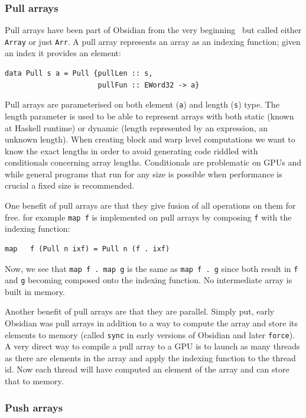 \documentclass[a4paper]{book}
\begin{document}
\subsubsection{Pull arrays}

Pull arrays have been part of Obsidian from the very beginning~\citet{JMT} but called either 
{\tt Array} or just {\tt Arr}. A pull array represents an array as an indexing function; given 
an index it provides an element: 

\begin{verbatim} 
data Pull s a = Pull {pullLen :: s, 
                      pullFun :: EWord32 -> a}
\end{verbatim} 

Pull arrays are parameterised on both element ({\tt a}) and length ({\tt s}) type. The length 
parameter is used to be able to represent arrays with both static (known at Haskell runtime) 
or dynamic (length represented by an expression, an unknown length). When creating block and 
warp level computations we want to know the exact lengths in order to avoid generating code 
riddled with conditionals concerning array lengths. Conditionals are problematic on GPUs and 
while general programs that run for any size is possible when performance is crucial a fixed 
size is recommended. 

One benefit of pull arrays are that they give fusion of all operations on them for free. for example {\tt map f} is implemented on pull arrays by composing {\tt f} with the indexing function: 

\begin{verbatim} 
map   f (Pull n ixf) = Pull n (f . ixf)
\end{verbatim}

Now, we see that {\tt map f . map g} is the same as {\tt map f . g} since both result in {\tt f}
and {\tt g} becoming composed onto the indexing function. No intermediate array is built in 
memory.  

Another benefit of pull arrays are that they are parallel. Simply put, early Obsidian was pull 
arrays in addition to a way to compute the array and store its elements to memory 
(called {\tt sync} in early versions of Obsidian and later {\tt force}). A very 
direct way to compile a pull array to a GPU is to launch as many threads as there are 
elements in the array and apply the indexing function to the thread id. Now each thread 
will have computed an element of the array and can store that to memory. 

 
\subsubsection{Push arrays}
\end{document}
